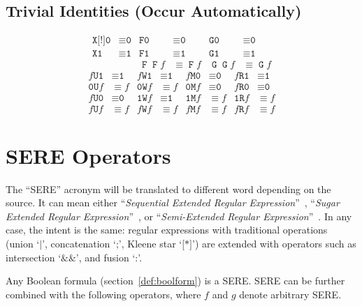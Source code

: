 \documentclass[a4paper,twoside,10pt,DIV=12]{scrreprt}
\DeclareMathOperator{\F}{\texttt{F}}
\DeclareMathOperator{\G}{\texttt{G}}
\newcommand{\U}{\mathbin{\texttt{U}}}
\newcommand{\R}{\mathbin{\texttt{R}}}
\DeclareMathOperator{\X}{\texttt{X}}
\newcommand{\StrongX}{\texttt{X[!]}}
\newcommand{\M}{\mathbin{\texttt{M}}}
\newcommand{\W}{\mathbin{\texttt{W}}}
\newcommand{\OR}{\mathbin{\texttt{|}}}
\newcommand{\ANDALT}{\mathbin{\texttt{\&\&}}}
\newcommand{\FUSION}{\mathbin{\texttt{:}}}
\newcommand{\CONCAT}{\mathbin{\texttt{;}}}
\newcommand{\0}{\texttt{0}}
\newcommand{\1}{\texttt{1}}
\newcommand{\STAR}[1]{\texttt{[*#1]}}
\begin{document}
\subsection{Trivial Identities (Occur Automatically)}

  \begin{align*}
    \StrongX\0 &\equiv \0 &
    \F\0 &\equiv \0 &
    \G\0 &\equiv \0 \\
    \X\1 &\equiv \1 &
    \F\1 &\equiv \1 &
    \G\1 &\equiv \1 \\
               &                &
    \F\F f&\equiv \F f &
    \G\G f&\equiv \G f
  \end{align*}
  \begin{align*}
    f\U\1&\equiv \1 &
    f\W\1&\equiv \1 &
    f\M\0&\equiv \0 &
    f\R\1&\equiv \1 \\
    \0\U f&\equiv f &
    \0\W f&\equiv f &
    \0\M f&\equiv \0 &
    f\R\0&\equiv \0 \\
    f\U\0&\equiv \0 &
    \1\W f&\equiv \1 &
    \1\M f&\equiv f &
    \1\R f&\equiv f \\
    f\U f&\equiv f &
    f\W f&\equiv f &
    f\M f&\equiv f &
    f\R f&\equiv f
  \end{align*}

\section{SERE Operators}\label{sec:sere}

The ``SERE'' acronym will be translated to different word depending on
the source.  It can mean either ``\textit{Sequential Extended Regular
  Expression}''~\citep{eisner.06.psl,psl.04.lrm}, ``\textit{Sugar
  Extended Regular Expression}''~\citep{beer.01.cav}, or
``\textit{Semi-Extended Regular Expression}''~\citep{eisner.08.hvc}.
In any case, the intent is the same: regular expressions with
traditional operations (union `$\OR$', concatenation `$\CONCAT$',
Kleene star `$\STAR{}$') are extended with operators such as
intersection `$\ANDALT$', and fusion `$\FUSION$'.

Any Boolean formula (section~\ref{def:boolform}) is a SERE.  SERE can
be further combined with the following operators, where $f$ and $g$
denote arbitrary SERE.
\end{document}
